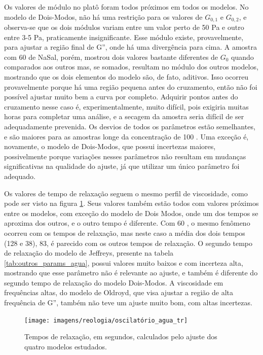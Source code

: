 	Os valores de módulo no platô foram todos próximos em todos os modelos. No modelo de Dois-Modos, não há uma restrição para os valores de \(G_{0,1}\) e \(G_{0,2}\), e observa-se que os dois módulos variam entre um valor perto de 50 Pa e outro entre 3-5 Pa, praticamente insignificante. Esse módulo existe, provavelmente, para ajustar a região final de G'', onde há uma divergência para cima. A amostra com 60 \mM{} de NaSal, porém, mostrou dois valores bastante diferentes de \(G_0\) quando comparados aos outros mas, se somados, resultam no módulo dos outros modelos, mostrando que os dois elementos do modelo são, de fato, aditivos. Isso ocorreu provavelmente porque há uma região pequena antes do cruzamento, então não foi possível ajustar muito bem a curva por completo. Adquirir pontos antes do cruzamento nesse caso é, experimentalmente, muito difícil, pois exigiria muitas horas para completar uma análise, e a secagem da amostra seria difícil de ser adequadamente prevenida. Os desvios de todos os parâmetros estão semelhantes, e são maiores para as amostras longe da concentração de 100 \mM. Uma exceção é, novamente, o modelo de Dois-Modos, que possui incertezas maiores, possivelmente porque variações nesses parâmetros não resultam em mudanças significativas na qualidade do ajuste, já que utilizar um único parâmetro foi adequado.
	
	Os valores de tempo de relaxação seguem o mesmo perfil de viscosidade, como pode ser visto na figura \ref{fig:oscilatorio_agua_tr}. Seus valores também estão todos com valores próximos entre os modelos, com exceção do modelo de Dois Modos, onde um dos tempos se aproxima dos outros, e o outro tempo é diferente. Com 60 \mM, o mesmo fenômeno ocorreu com os tempos de relaxação, mas neste caso a média dos dois tempos (128 e 38), 83, é parecido com os outros tempos de relaxação. O segundo tempo de relaxação do modelo de Jeffreys, presente na tabela \ref{tab:outros_params_agua}, possui valores muito baixos e com incerteza alta, mostrando que esse parâmetro não é relevante ao ajuste, e também é diferente do segundo tempo de relaxação do modelo Dois-Modos. A viscosidade em frequências altas, do modelo de Oldroyd, que visa ajustar a região de alta frequência de G'', também não teve um ajuste muito bom, com altas incertezas.
	
	\begin{figure}[h]
		\centering
		\texttt{[image: imagens/reologia/oscilatório\_agua\_tr]}
		\caption{Tempos de relaxação, em segundos, calculados pelo ajuste dos quatro modelos estudados.}
		\label{fig:oscilatorio_agua_tr}  
	\end{figure}
	

